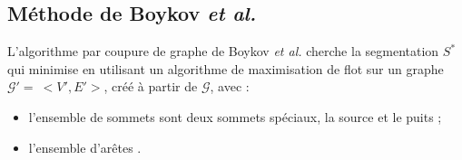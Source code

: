 \subsection{Méthode de Boykov \textit{et al.}}
\label{sec:sota:boykov}
L'algorithme par coupure de graphe de Boykov \textit{et al.} \cite{boykov2001interactive} cherche la segmentation $S^{*}$ qui minimise  en utilisant un algorithme de maximisation de flot sur un graphe $\mathcal{G}'=\ <V',E'>$, créé à partir de $\mathcal{G}$,  avec :
\begin{itemize}
\item l'ensemble de sommets  sont deux sommets spéciaux, la source et le puits ;
\item l'ensemble d'arêtes .
\end{itemize}

